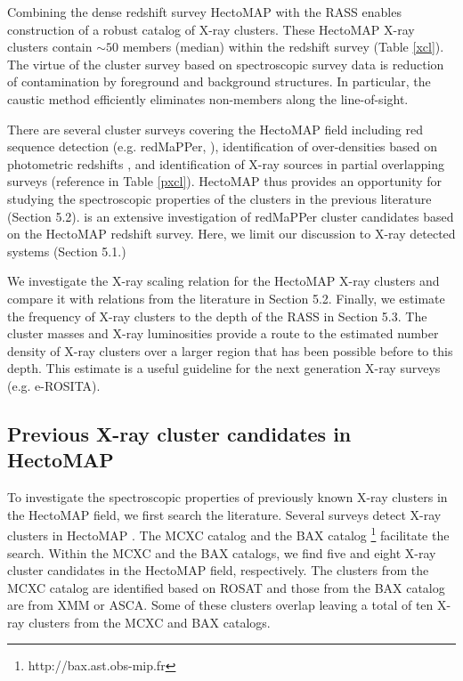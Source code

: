 \documentclass[iop, apj]{emulateapj}
\begin{document}
Combining the dense redshift survey HectoMAP 
 with the RASS enables construction of 
 a robust catalog of X-ray clusters. 
These HectoMAP X-ray clusters contain $\sim 50$ members (median)
 within the redshift survey (Table \ref{xcl}).
The virtue of the cluster survey based on spectroscopic survey data
 is reduction of contamination by foreground and background structures. 
In particular, the caustic method efficiently eliminates 
 non-members along the line-of-sight. 

There are several cluster surveys covering the HectoMAP field 
 including red sequence detection (e.g. redMaPPer, \citealp{Rykoff14}), 
 identification of over-densities based on photometric redshifts \citep{Wen09}, and 
 identification of X-ray sources in partial overlapping surveys (reference in Table \ref{pxcl}). 
HectoMAP thus provides an opportunity  for studying 
 the spectroscopic properties of the clusters in the previous literature (Section 5.2). 
\citet{Sohn17b} is an extensive investigation of redMaPPer cluster candidates 
 based on the HectoMAP redshift survey. 
Here, we limit our discussion to X-ray detected systems (Section 5.1.)

We investigate the X-ray scaling relation 
 for the HectoMAP X-ray clusters and 
 compare it with relations from the literature in Section 5.2. 
Finally, we estimate the frequency of X-ray clusters 
 to the depth of the RASS in Section 5.3. 
The cluster masses and X-ray luminosities provide 
 a route to the estimated number density of X-ray clusters 
 over a larger region that has been possible before to this depth. 
This estimate is a useful guideline 
 for the next generation X-ray surveys (e.g. e-ROSITA). 


\subsection{Previous X-ray cluster candidates in HectoMAP}\label{lit}

To investigate the spectroscopic properties of previously known X-ray clusters in the HectoMAP field, 
 we first search the literature. 
Several surveys detect X-ray clusters in HectoMAP
 \citep{Vikhlinin98, David99, Bohringer00, Lubin04, Burenin07, Horner08, Voevodkin10}. 
The MCXC catalog \citep{Piffaretti11} and the BAX catalog \footnote{http://bax.ast.obs-mip.fr}
 facilitate the search. 
Within the MCXC and the BAX catalogs, 
 we find five and eight X-ray cluster candidates in the HectoMAP field, respectively. 
The clusters from the MCXC catalog are identified based on ROSAT 
 and those from the BAX catalog are from XMM or ASCA. 
Some of these clusters overlap leaving 
 a total of ten X-ray clusters from the MCXC and BAX catalogs. 
 
\end{document}

